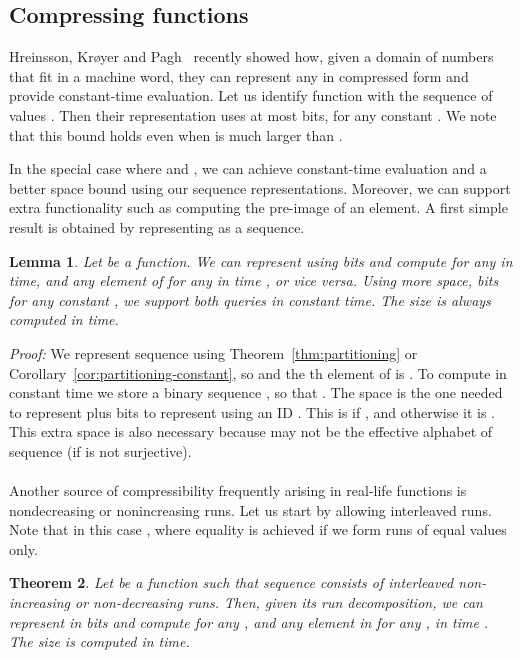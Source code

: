 \documentclass[11pt]{article}
\newtheorem{theorem}{Theorem}
\newtheorem{lemma}[theorem]{Lemma}
\newenvironment{proof}{\textit{Proof:}}{\hfill \paragraph{} }
\begin{document}
\begin{table}[t]
{\begin{tabular}
\section{Compressing functions} \label{sec:functions}

Hreinsson, Kr{\o}yer and Pagh~\cite{HKP09} recently showed how, given a
domain  of numbers that
fit in a machine word, they can represent any  in compressed form and provide constant-time evaluation.
Let us identify function  with the sequence of values
. Then their representation uses
at most  bits, for any constant .
We note that this bound holds even when  is much larger than . 

In the special case where  and , 
we can achieve constant-time evaluation and a better space
bound using our sequence representations. Moreover, we can support extra
functionality such as computing the pre-image of an element.
A first simple result is obtained by representing  as a sequence.

\begin{lemma} \label{lem:string_function}
Let  be a function.
We can represent  using  bits and
compute  for any  in  time, and any element of 
 for any  in time , or vice 
versa.  Using more space,  bits for any constant 
, we support both queries in constant time.
The size  is always computed in  time.
\end{lemma}
\begin{proof}
We represent sequence  using Theorem~\ref{thm:partitioning} or
Corollary~\ref{cor:partitioning-constant},
so  and the th element of  is
. To compute  in constant time we store a
binary sequence
, so
that . The space is the one
needed to represent  plus  bits to 
represent  using an ID 
\cite{RRR02}. This is  if ,
and otherwise it is . This extra space is also necessary
because  may not be the effective alphabet of sequence 
(if  is not surjective).
\end{proof}

Another source of compressibility frequently arising in real-life functions
is nondecreasing or nonincreasing runs. Let us start by allowing interleaved 
runs. Note that in this case , where 
equality is achieved if we form runs of equal values only. 

\begin{theorem} \label{thm:function}
  Let  be a 
  function such that sequence  consists of
   interleaved non-increasing or non-decreasing runs.
  Then, given its run decomposition,
   we can represent  in  bits and compute  for any , and
  any element in  for any ,
  in time .
  The size  is computed in  time.
\end{theorem}


\end{tabular}}
\end{table}
\end{document}
